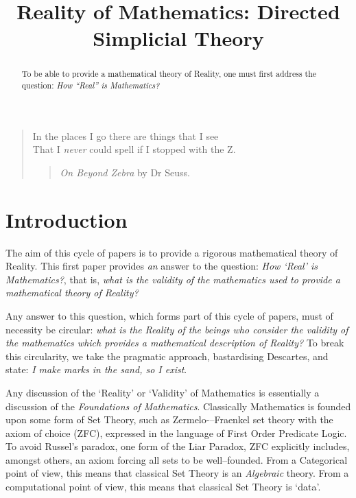 \documentclass[a4paper,openany]{amsbook}
\begin{document}
\frontmatter
\sloppy

\title[DiSimplicial Theory]{Reality of Mathematics: Directed Simplicial Theory}

%

\begin{abstract}
To be able to provide a mathematical theory of Reality, one must first 
address the question: \textit{How ``Real'' is Mathematics?}
\end{abstract} 
\maketitle 
\tableofcontents 
\mainmatter

\begin{quotation}
In the places I go there are things that I see\\
That I \emph{never} could spell if I stopped with the Z.\\
\begin{quote}
\textit{On Beyond Zebra} by Dr Seuss.
\end{quote}
\end{quotation}

\section{Introduction}

The aim of this cycle of papers is to provide a rigorous mathematical theory of
Reality. This first paper provides \emph{an} answer to the question: \emph{How
`Real' is Mathematics?}, that is, \emph{what is the validity of the
mathematics used to provide a mathematical theory of Reality?}

Any answer to this question, which forms part of this cycle of papers, must of
necessity be circular: \emph{what is the Reality of the beings who consider the
validity of the mathematics which provides a mathematical description of
Reality?} To break this circularity, we take the pragmatic approach,
bastardising Descartes, and state: \emph{I make marks in the sand, so I exist}.

Any discussion of the `Reality' or `Validity' of Mathematics is essentially a
discussion of the \textit{Foundations of Mathematics}. Classically Mathematics
is founded upon some form of Set Theory, such as Zermelo-–Fraenkel set theory
with the axiom of choice (ZFC), expressed in the language of First Order
Predicate Logic. To avoid Russel's paradox, one form of the Liar Paradox, ZFC
explicitly includes, amongst others, an axiom forcing all sets to be
well--founded. From a Categorical point of view, this means that classical Set
Theory is an \emph{Algebraic} theory. From a computational point of view, this
means that classical Set Theory is `data'.
\end{document}
